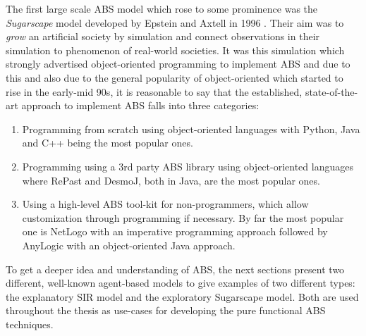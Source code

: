 The first large scale ABS model which rose to some prominence was the \textit{Sugarscape} model developed by Epstein and Axtell in 1996 \cite{epstein_growing_1996}. Their aim was to \textit{grow} an artificial society by simulation and connect observations in their simulation to phenomenon of real-world societies. It was this simulation which strongly advertised object-oriented programming to implement ABS and due to this and also due to the general popularity of object-oriented which started to rise in the early-mid 90s, it is reasonable to say that the established, state-of-the-art approach to implement ABS falls into three categories: %
\begin{enumerate}
	\item Programming from scratch using object-oriented languages with Python, Java and C++ being the most popular ones.
	\item Programming using a 3rd party ABS library using object-oriented languages where RePast and DesmoJ, both in Java, are the most popular ones.
	\item Using a high-level ABS tool-kit for non-programmers, which allow customization through programming if necessary. By far the most popular one is NetLogo with an imperative programming approach followed by AnyLogic with an object-oriented Java approach.
\end{enumerate}

To get a deeper idea and understanding of ABS, the next sections present two different, well-known agent-based models to give examples of two different types: the explanatory SIR model and the exploratory Sugarscape model. Both are used throughout the thesis as use-cases for developing the pure functional ABS techniques.




